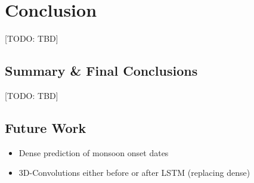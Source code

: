 \chapter{Conclusion}
\label{c:conclusion}
[TODO: TBD]

\section{Summary \& Final Conclusions}
[TODO: TBD]

\section{Future Work}
\begin{itemize}
  \item Dense prediction of monsoon onset dates
  \item 3D-Convolutions either before or after LSTM (replacing dense)
\end{itemize}
